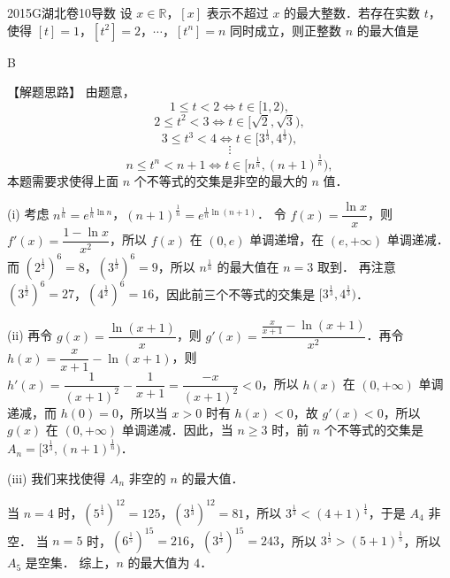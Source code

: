 
\begin{problem}{2015}{G}{湖北卷}{10}{导数}
设 $ x\in\mathbb{R} $，$ [x] $ 表示不超过 $ x $ 的最大整数．若存在实数 $ t $，使得 $ [t]=1 $，$ [t^2]=2 $，$ \cdots $，$ [t^n]=n $ 同时成立，则正整数 $ n $ 的最大值是

\begin{choices}
\end{choices}
\end{problem}

\begin{answer}
B
\end{answer}

\begin{solutions}
【解题思路】 由题意，
$$
1\leqslant t<2 \Leftrightarrow t\in[1,2),
$$
$$
2\leqslant t^2<3 \Leftrightarrow t\in[\sqrt{2},\sqrt{3}),
$$
$$
3\leqslant t^3<4 \Leftrightarrow t\in[3^{\frac{1}{3}},4^{\frac{1}{3}}),
$$
$$
\vdots
$$
$$
n\leqslant t^n<n+1 \Leftrightarrow t\in[n^{\frac{1}{n}},(n+1)^{\frac{1}{n}}),
$$
本题需要求使得上面 $ n $ 个不等式的交集是非空的最大的 $ n $ 值．

(i) 考虑 $ n^{\frac{1}{n}}=e^{\frac{1}{n}\ln n} $，$ (n+1)^{\frac{1}{n}}=e^{\frac{1}{n}\ln(n+1)} $．  
令 $ f(x)=\dfrac{\ln x}{x} $，则 $ f'(x)=\dfrac{1-\ln x}{x^2} $，所以 $ f(x) $ 在 $ (0,e) $ 单调递增，在 $ (e,+\infty) $ 单调递减．而 $ (2^{\frac{1}{2}})^6=8 $，$ (3^{\frac{1}{3}})^6=9 $，所以 $ n^{\frac{1}{n}} $ 的最大值在 $ n=3 $ 取到．  
再注意 $ (3^{\frac{1}{2}})^6=27 $，$ (4^{\frac{1}{2}})^6=16 $，因此前三个不等式的交集是 $ [3^{\frac{1}{3}},4^{\frac{1}{3}}) $．

(ii) 再令 $ g(x)=\dfrac{\ln(x+1)}{x} $，则 $ g'(x)=\dfrac{\frac{x}{x+1}-\ln(x+1)}{x^2} $．再令 $ h(x)=\dfrac{x}{x+1}-\ln(x+1) $，则 $ h'(x)=\dfrac{1}{(x+1)^2}-\dfrac{1}{x+1}=\dfrac{-x}{(x+1)^2}<0 $，所以 $ h(x) $ 在 $ (0,+\infty) $ 单调递减，而 $ h(0)=0 $，所以当 $ x>0 $ 时有 $ h(x)<0 $，故 $ g'(x)<0 $，所以 $ g(x) $ 在 $ (0,+\infty) $ 单调递减．因此，当 $ n\geqslant 3 $ 时，前 $ n $ 个不等式的交集是 $ A_n=[3^{\frac{1}{3}},(n+1)^{\frac{1}{n}}) $．

(iii) 我们来找使得 $ A_n $ 非空的 $ n $ 的最大值．

当 $ n=4 $ 时，$ (5^{\frac{1}{4}})^{12}=125 $，$ (3^{\frac{1}{3}})^{12}=81 $，所以 $ 3^{\frac{1}{3}}<(4+1)^{\frac{1}{4}} $，于是 $ A_4 $ 非空．  
当 $ n=5 $ 时，$ (6^{\frac{1}{5}})^{15}=216 $，$ (3^{\frac{1}{3}})^{15}=243 $，所以 $ 3^{\frac{1}{3}}>(5+1)^{\frac{1}{5}} $，所以 $ A_5 $ 是空集．  
综上，$ n $ 的最大值为 $ 4 $．
\end{solutions}